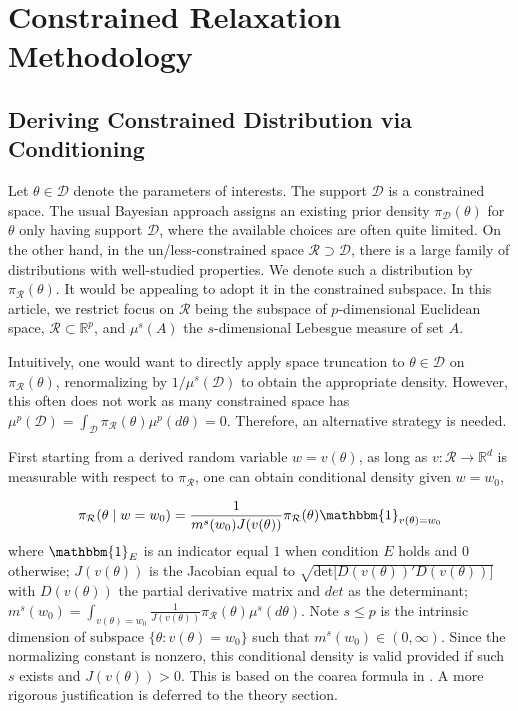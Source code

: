 \documentclass[10pt,fleqn]{article}
\newcommand{\be}{\begin{equation}\begin{aligned}}
\newcommand{\ee}{\end{aligned}\end{equation}}
\newcommand{\bb}[1]{\mathbb{#1}}
\newcommand{\mc}[1]{\mathcal{#1}}
\DeclareMathOperator{\1}{\mathbbm{1}}
\begin{document}
\section{Constrained Relaxation Methodology}

\subsection{Deriving Constrained Distribution via Conditioning}

Let $\theta \in \mc D$ denote the parameters of interests. The support $\mc
D$ is a constrained space. The usual Bayesian approach assigns an existing prior
density $\pi_{\mc D}(\theta)$ for $\theta$ only having support $\mc D$, where the available choices are often quite limited. On the other hand, in the un/less-constrained space $\mc R\supset \mc D$, there is a large family of
distributions with well-studied properties. We denote such a distribution by $\pi_{\mc R}(\theta)$. It would be appealing to 
adopt it in the constrained subspace. In this article, we restrict focus on $\mc R$ being the subspace of $p$-dimensional Euclidean space, $\mc R\subset \bb R^p$, and   $\mu^s(A)$ the $s$-dimensional Lebesgue measure of set $A$.

Intuitively, one would want to directly apply space truncation to ${\theta\in\mc D}$ on $\pi_{\mc R}(\theta)$, renormalizing by $1/\mu^s(\mc D)$ to obtain the appropriate density. However, this often does not work as many constrained
space has $\mu^p(\mc D)=\int_{\mc D}  \pi_{\mc R}(\theta) \mu^p(d\theta)=0$. Therefore, an alternative strategy is needed.

First starting from  a derived random variable $w=v(\theta)$, as long as $v:\mc R\rightarrow \bb R^d$ is measurable with respect to $\pi_{\mc R}$, one can obtain conditional density given $w=w_0$,

\be
\pi_{\mc R}(\theta \mid w=w_0) = \frac{1}{m^s(w_0) J(v(\theta))} \pi_{\mc R}(\theta) \mathbbm{1}_{v(\theta)=w_0}
\ee
where $\mathbbm{1}_{E}$ is an indicator equal $1$ when condition
$E$ holds and $0$ otherwise; $J(v(\theta))$ is the Jacobian equal to
$\sqrt{\mbox{det[}D(v(\theta))'
D(v(\theta))]}$ with $D(v(\theta))$ the partial derivative matrix and $det$
as the determinant; $m^s(w_0)=\int_{v(\theta)=w_0} \frac{1}{J(v(\theta))} \pi_{\mc R}(\theta) \mu^s(d\theta) $. Note   $s\le p$ is  the intrinsic dimension of subspace $\{\theta: v(\theta)=w_0\}$ such that  $m^s(w_0)\in(0,\infty)$. Since the normalizing constant is nonzero, this conditional density is valid provided
if such $s$ exists and $J(v(\theta))>0$. This is based on the coarea
formula in \cite{federer2014geometric}. A more rigorous justification
is deferred to the theory section.
\end{document}
